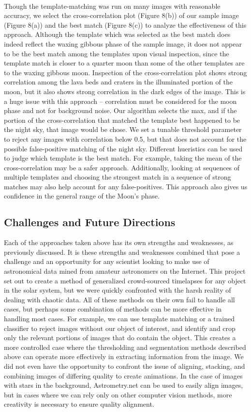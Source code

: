 \documentclass[]{article}
\begin{document}
\\
Though the template-matching was run on many images with reasonable accuracy, we select the cross-correlation plot (Figure 8(b)) of our sample image (Figure 8(a)) and the best match (Figure 8(c)) to analyze the effectiveness of this approach. Although the template which was selected as the best match does indeed reflect the waxing gibbous phase of the sample image, it does not appear to be the best match among the templates upon visual inspection, since the template match is closer to a quarter moon than some of the other templates are to the waxing gibbous moon. Inspection of the cross-correlation plot shows strong correlation among the lava beds and craters in the illuminated portion of the moon, but it also shows strong correlation in the dark edges of the image. This is a huge issue with this approach -- correlation must be considered for the moon phase and not for background noise. Our algorithm selects the max, and if the portion of the cross-correlation that matched the template best happened to be the night sky, that image would be chose. We set a tunable threshold parameter to reject any images with correlation below 0.5, but that does not account for the possible false-positive matching of the night sky. Different hueristics can be used to judge which template is the best match. For example, taking the mean of the cross-correlation may be a safer approach. Additionally, looking at sequences of multiple templates and choosing the strongest match in a sequence of strong matches may also help account for any false-positives. This approach also gives us confidence in the general range of the Moon's phase.
\subsection*{Challenges and Future Directions}
Each of the approaches taken above has its own strengths and weaknesses, as previously discussed. It is these strengths and weaknesses combined that pose a challenge and an opportunity for any scientist looking to make use of astronomical data mined from amateur astronomers on the Internet. This project set out to create a method of generalized crowd-sourced timelapses for any object in the solar system, but we were quickly confronted with the harsh reality of dealing with chaotic data. All of these methods on their own fail to handle all cases, but perhaps some combination of methods can be more effective in handling most cases. For example, we can use template matching or a trained classifier to reject images without our object of interest, and identify and crop only the relevant portions of images that do contain the object. This creates a more controlled case where the thresholding and segmentation methods described above can operate more effectively in extracting information from the image. We did not even have the opportunity to confront the issue of aligning, stacking, and combining images of differing quality to create animations. In the case of images with stars in the background, Astrometry.net can be used to easily align images, but in cases where we can rely only on other computer vision methods, more creativity is necessary to ensure quality alignment.
\end{document}
